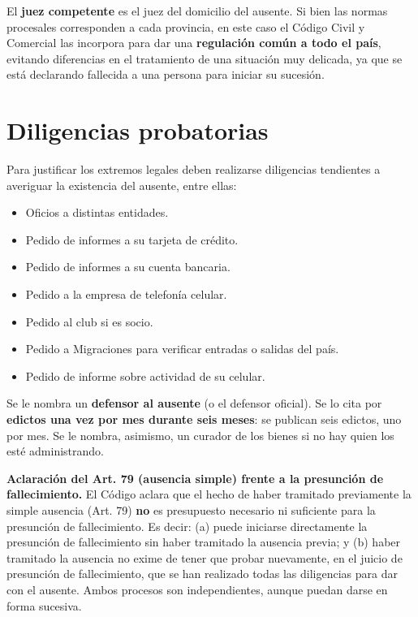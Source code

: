 \documentclass[12pt,oneside]{book}
\begin{document}
El \textbf{juez competente} es el juez del domicilio del ausente. Si bien
las normas procesales corresponden a cada provincia, en este caso el
Código Civil y Comercial las incorpora para dar una
\textbf{regulación común a todo el país}, evitando diferencias en el
tratamiento de una situación muy delicada, ya que se está declarando
fallecida a una persona para iniciar su sucesión.

\section{Diligencias probatorias}

Para justificar los extremos legales deben realizarse diligencias
tendientes a averiguar la existencia del ausente, entre ellas:

\begin{itemize}
    \item Oficios a distintas entidades.
    \item Pedido de informes a su tarjeta de crédito.
    \item Pedido de informes a su cuenta bancaria.
    \item Pedido a la empresa de telefonía celular.
    \item Pedido al club si es socio.
    \item Pedido a Migraciones para verificar entradas o salidas del país.
    \item Pedido de informe sobre actividad de su celular.
\end{itemize}

Se le nombra un \textbf{defensor al ausente} (o el defensor oficial). Se
lo cita por \textbf{edictos una vez por mes durante seis meses}: se
publican seis edictos, uno por mes. Se le nombra, asimismo, un curador de
los bienes si no hay quien los esté administrando.

\begin{important}
\textbf{Aclaración del Art. 79 (ausencia simple) frente a la presunción
de fallecimiento.} El Código aclara que el hecho de haber tramitado
previamente la simple ausencia (Art. 79) \textbf{no} es presupuesto
necesario ni suficiente para la presunción de fallecimiento. Es decir:
(a) puede iniciarse directamente la presunción de fallecimiento sin haber
tramitado la ausencia previa; y (b) haber tramitado la ausencia no exime
de tener que probar nuevamente, en el juicio de presunción de
fallecimiento, que se han realizado todas las diligencias para dar con el
ausente. Ambos procesos son independientes, aunque puedan darse en forma
sucesiva.
\end{important}
\end{document}
